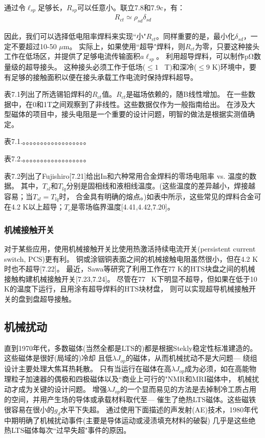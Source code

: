 通过令$\ell_{sp}$足够长，$R_{sp}$可以任意小。联立7.8和7.9c，有：
\begin{align}%
R_{ct}\simeq\rho_{sd}\delta_{sd}
\end{align}

因此，我们可以选择低电阻率焊料来实现``小"$R_{ct}$。同样重要的是，最小化$\delta_{sd}$，一定不要超过10-50 $\mu$m。
实际上，如果使用``超导"焊料，则$R_{ct}$为零，只要这种接头工作在低场区，并提供了足够电流传输面积$a\ell_{sp}$。
利用超导焊料，可以制作$\mathrm{p\Omega}$数量级的超导接头。
这种接头必须工作于低场($\le 1$~ T)和深冷($\le 9$ K)环境中，要有足够的接触面积以便在接头承载工作电流时保持焊料超导。

表7.1列出了所选锡铅焊料的$R_{ct}$值。$R_{ct}$是磁场依赖的，随B线性增加。
在一些数据中，在0和1T之间观察到了非线性。这些数据仅作为一般指南给出。
在涉及大型磁体的项目中，接头电阻是一个重要的设计问题，明智的做法是根据实测值确定。


表7.1.。。。。。。。。。。。。。。。。。。

表7.2.。。。。。。。。。。。。。。。。。。

表7.2列出了Fujishiro[7.21]给出In和六种常用合金焊料的零场电阻率 vs. 温度的数据。
其中，$T_{sl}$和$T_{lq}$分别是固相线和液相线温度。(这些温度的差异越小，焊接越容易；当$T_{sl} = T_{lq}$时，
合金具有明确的熔点。)如表中所示，这些常见的焊料合金可在4.2 K以上超导；$T_c$是零场临界温度[4.41,4.42,7.20]。

\subsubsection*{机械接触开关}
对于某些应用，使用机械接触开关比使用热激活持续电流开关(persistent current switch, PCS)更有利。
铜或涂铟铜表面之间的机械接触电阻虽然很小，但在4.2 K时也不超导[7.22]。
最近，Sawa等研究了利用工作在77 K的HTS块盘之间的机械接触构建机械接触开关[7.23,7.24]。
尽管在77~ K下明显不超导，但如果在低于10 K的温度下运行，且用涂有超导焊料的HTS块材盘，
则可以实现超导机械接触开关的盘到盘超导接触。

\subsection{机械扰动}
直到1970年代，多数磁体(当然全都是LTS的)都是根据Stekly稳定性标准建造的。这些磁体是很好(局域的)冷却
且低$\lambda J_{op}$的磁体，从而机械扰动不是大问题---
绕组设计主要处理大焦耳热耗散。
只有当运行在磁体在高$\lambda J_{op}$成为必须，如在高能物理粒子加速器的偶极和四极磁体以及``商业上可行的"NMR和MRI磁体中，
机械扰动才成为关键的设计问题。
增强$\lambda J_{op}$的一个显而易见的方法是去掉制冷工质占用的空间，并用产生场的导体或承载材料取代至---
催生了绝热LTS磁体。这些磁铁很容易在很小的$g_d$水平下失超。
通过使用下面描述的声发射(AE)技术，1980年代中期明确了机械扰动事件(主要是导体运动或浸渍填充材料的破裂)
几乎是这些绝热LTS磁体每次``过早失超"事件的原因。



